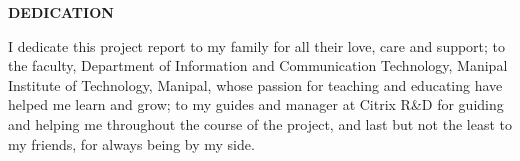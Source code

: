 \begin{center}
	\large\textbf{DEDICATION}\\
	\vspace{1cm}
\end{center}
\begin{center}
	\justify I dedicate this project report to my family for all their love, care and support; to the faculty, Department of Information and Communication Technology, Manipal Institute of Technology, Manipal, whose passion for teaching and educating have helped me learn and grow; to my guides and manager at Citrix R\&D for guiding and helping me throughout the course of the project, and last but not the least to my friends, for always being by my side.  
\end{center}